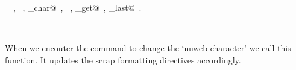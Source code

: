 \documentclass{report}
\begin{document}
\begin{flushleft}
\begin{minipage}{\linewidth}
\footnotesize\addtolength{\baselineskip}{-1ex}
\begin{list}{}{\setlength{\itemsep}{-\parsep}\setlength{\itemindent}{-\leftmargin}}
\item \NWtxtIdentsUsed\nobreak\  \verb@FILE@\nobreak\ , \verb@fputs@\nobreak\ , \verb@nw_char@\nobreak\ , \verb@putc@\nobreak\ , \verb@source_get@\nobreak\ , \verb@source_last@\nobreak\ .\end{list}
\end{minipage}\\[4ex]
\end{flushleft}
When we encouter the command to change the `nuweb character' we call
this function. It updates the scrap formatting directives accordingly.
\end{document}
